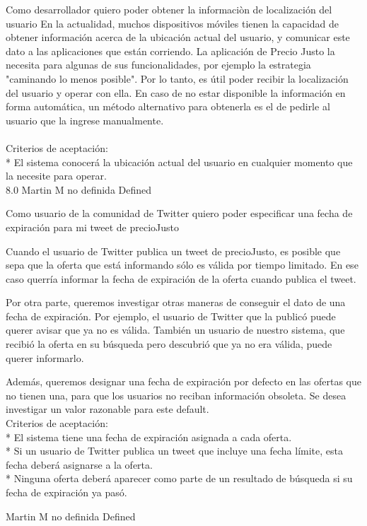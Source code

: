 \vspace{20pt}

	{Como desarrollador quiero poder obtener la informaciòn de localización del usuario} %
	{En la actualidad, muchos dispositivos móviles tienen la capacidad de obtener
información acerca de la ubicación actual del usuario, y comunicar este dato a
las aplicaciones que están corriendo. La aplicación de Precio Justo la
necesita para algunas de sus funcionalidades, por ejemplo la estrategia
"caminando lo menos posible". Por lo tanto, es útil poder recibir la
localización del usuario y operar con ella.
En caso de no estar disponible la información en forma automática, un método
alternativo para obtenerla es el de pedirle al usuario que la ingrese
manualmente.\\
  \\
Criterios de aceptación:\\
* El sistema conocerá la ubicación actual del usuario en cualquier momento que la necesite para operar.\\
} %
	{} %
	{8.0} %
	{Martin M} %
	{no definida} %
	{Defined} %


\vspace{20pt}

	{Como usuario de la comunidad de Twitter quiero poder especificar una fecha de expiración para mi tweet de precioJusto} %
	{Cuando el usuario de Twitter publica un tweet de precioJusto, es posible que
sepa que la oferta que está informando sólo es válida por tiempo limitado. En
ese caso querría informar la fecha de expiración de la oferta cuando publica
el tweet.

Por otra parte, queremos investigar otras maneras de conseguir el dato de una
fecha de expiración. Por ejemplo, el usuario de Twitter que la publicó puede
querer avisar que ya no es válida. También un usuario de nuestro sistema, que
recibió la oferta en su búsqueda pero descubrió que ya no era válida, puede
querer informarlo.
  
Además, queremos designar una fecha de expiración por defecto en las ofertas
que no tienen una, para que los usuarios no reciban información obsoleta. Se
desea investigar un valor razonable para este default.
  \\
Criterios de aceptación:\\
* El sistema tiene una fecha de expiración asignada a cada oferta.  \\
* Si un usuario de Twitter publica un tweet que incluye una fecha límite, esta fecha deberá asignarse a la oferta.  \\
* Ninguna oferta deberá aparecer como parte de un resultado de búsqueda si su fecha de expiración ya pasó.\\
} %
	{} %
	{} %
	{Martin M} %
	{no definida} %
	{Defined} %


